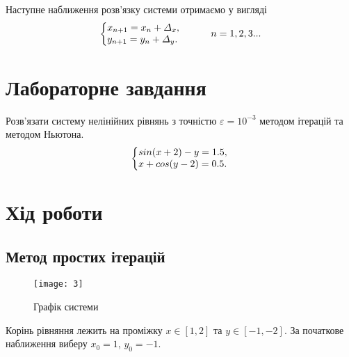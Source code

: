 \documentclass{article}
\begin{document}
\begin{large}
		Наступне наближення розв'язку системи отримаємо у вигляді
		\begin{gather}
			\left\{\begin{array}{@{}l@{}}
				x_{n+1} = x_n + \varDelta_x,\\\nonumber
				y_{n+1} = y_n + \varDelta_y.\nonumber
			\end{array}\right.\,
			\hspace{28pt}
			n=1,2,3...
		\end{gather}
		\section*{Лабораторне завдання}
		Розв'язати систему нелінійних рівнянь з точністю $\varepsilon=10^{-3}$ методом ітерацій та методом Ньютона.
		\begin{gather}
			\left\{\begin{array}{@{}l@{}}
				sin(x+2)-y=1.5,\\\nonumber
				x+cos(y-2) = 0.5.\nonumber
			\end{array}\right.\,
		\end{gather}
		\section*{Хід роботи}
		\subsection*{Метод простих ітерацій}
		\begin{figure}[h!]
			\centering
			\texttt{[image: 3]}
			\caption{Графік системи}
		\end{figure}
		Корінь рівняння лежить на проміжку $x\in[1, 2]$ та $y\in[-1, -2]$.
		За початкове наближення виберу $x_0 = 1$, $y_0 = -1$.
		

\end{large}
\end{document}
